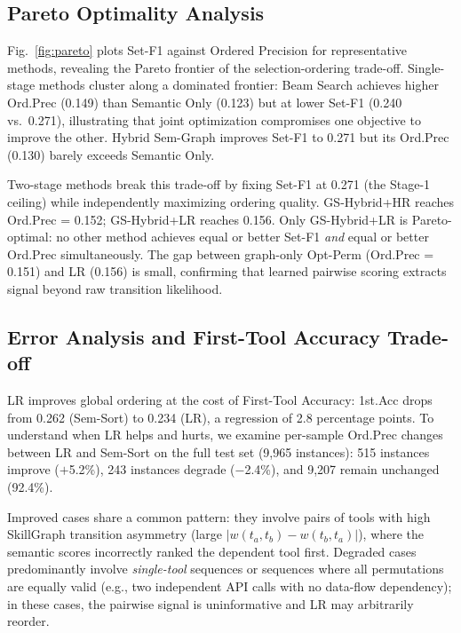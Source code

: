 \documentclass[lettersize,journal]{IEEEtran}
\begin{document}


\subsection{Pareto Optimality Analysis}



Fig.~\ref{fig:pareto} plots Set-F1 against Ordered Precision for representative methods, revealing the Pareto frontier of the selection-ordering trade-off.
Single-stage methods cluster along a dominated frontier: Beam Search achieves higher Ord.Prec (0.149) than Semantic Only (0.123) but at lower Set-F1 (0.240 vs.\ 0.271), illustrating that joint optimization compromises one objective to improve the other.
Hybrid Sem-Graph improves Set-F1 to 0.271 but its Ord.Prec (0.130) barely exceeds Semantic Only.

Two-stage methods break this trade-off by fixing Set-F1 at 0.271 (the Stage-1 ceiling) while independently maximizing ordering quality.
GS-Hybrid+HR reaches Ord.Prec = 0.152; GS-Hybrid+LR reaches 0.156.
Only GS-Hybrid+LR is Pareto-optimal: no other method achieves equal or better Set-F1 \emph{and} equal or better Ord.Prec simultaneously.
The gap between graph-only Opt-Perm (Ord.Prec = 0.151) and LR (0.156) is small, confirming that learned pairwise scoring extracts signal beyond raw transition likelihood.

\subsection{Error Analysis and First-Tool Accuracy Trade-off}

LR improves global ordering at the cost of First-Tool Accuracy: 1st.Acc drops from 0.262 (Sem-Sort) to 0.234 (LR), a regression of 2.8 percentage points.
To understand when LR helps and hurts, we examine per-sample Ord.Prec changes between LR and Sem-Sort on the full test set (9,965 instances):
515 instances improve ($+$5.2\%), 243 instances degrade ($-$2.4\%), and 9,207 remain unchanged (92.4\%).

Improved cases share a common pattern: they involve pairs of tools with high SkillGraph transition asymmetry (large $|w(t_a, t_b) - w(t_b, t_a)|$), where the semantic scores incorrectly ranked the dependent tool first.
Degraded cases predominantly involve \emph{single-tool} sequences or sequences where all permutations are equally valid (e.g., two independent API calls with no data-flow dependency); in these cases, the pairwise signal is uninformative and LR may arbitrarily reorder.
\end{document}
